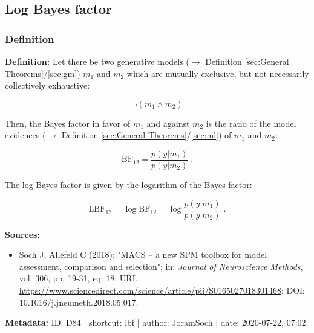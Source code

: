 \documentclass[a4paper,12pt,twoside]{book}
\begin{document}
\subsection{Log Bayes factor}

\subsubsection[\textit{Definition}]{Definition} \label{sec:lbf}
\setcounter{equation}{0}

\textbf{Definition:} Let there be two generative models ($\rightarrow$ Definition \ref{sec:General Theorems}/\ref{sec:gm}) $m_1$ and $m_2$ which are mutually exclusive, but not necessarily collectively exhaustive:

\begin{equation} \label{eq:lbf-m12}
\neg (m_1 \land m_2)
\end{equation}

Then, the Bayes factor in favor of $m_1$ and against $m_2$ is the ratio of the model evidences ($\rightarrow$ Definition \ref{sec:General Theorems}/\ref{sec:ml}) of $m_1$ and $m_2$:

\begin{equation} \label{eq:lbf-bf}
\mathrm{BF}_{12} = \frac{p(y|m_1)}{p(y|m_2)} \; .
\end{equation}

The log Bayes factor is given by the logarithm of the Bayes factor:

\begin{equation} \label{eq:lbf-lbf}
\mathrm{LBF}_{12} = \log \mathrm{BF}_{12} = \log \frac{p(y|m_1)}{p(y|m_2)} \; .
\end{equation}


\vspace{1em}
\textbf{Sources:}
\begin{itemize}
\item Soch J, Allefeld C (2018): "MACS – a new SPM toolbox for model assessment, comparison and selection"; in: \textit{Journal of Neuroscience Methods}, vol. 306, pp. 19-31, eq. 18; URL: \url{https://www.sciencedirect.com/science/article/pii/S0165027018301468}; DOI: 10.1016/j.jneumeth.2018.05.017.
\end{itemize}


\vspace{1em}
\textbf{Metadata:} ID: D84 | shortcut: lbf | author: JoramSoch | date: 2020-07-22, 07:02.
\vspace{1em}
\end{document}

